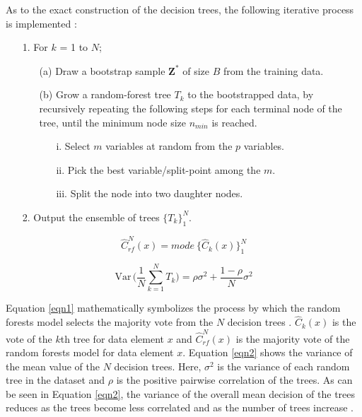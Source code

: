 \justify
As to the exact construction of the decision trees, the following iterative process is implemented \citep{Hastie2009}:
\begin{itemize}
	\item [1. ] For $k$ = 1 to $N$;
	\begin{itemize}
		\item [(a) ] Draw a bootstrap sample $\mathbf{Z^*}$ of size $B$ from the training data.
		\item [(b) ] Grow a random-forest tree $T_k$ to the bootstrapped data, by recursively repeating the following steps for each terminal node of the tree, until the minimum node size $n_{min}$ is reached.
		\begin{itemize}
			\item [i. ] Select $m$ variables at random from the $p$ variables.
			\item [ii. ] Pick the best variable/split-point among the $m$.
			\item [iii. ] Split the node into two daughter nodes.
		\end{itemize}
	\end{itemize}
	\item[2. ] Output the ensemble of trees $\{T_k\}^N_1$.
\end{itemize}

\begin{equation}
\label{eqn1}
\hat{C}^N_{rf}(x) = \textit{mode} ~\{\hat{C}_{k}(x)\}^{N}_{1}	
\end{equation}

\begin{equation}
\label{eqn2}
\mathrm{Var}\,\Bigg(\dfrac{1}{N}\sum\limits_{k=1}^N T_k\Bigg)= \rho \sigma^2 + \dfrac{1-\rho}{N}\sigma^2
\end{equation}

\justify
Equation \ref{eqn1} mathematically symbolizes the process by which the random forests model selects the majority vote from the $N$ decision trees \citep{Hastie2009}. $\hat{C}_{k}(x)$ is the vote of the $k$th tree for data element $x$ and $\hat{C}^N_{rf}(x)$ is the majority vote of the random forests model for data element $x$. Equation \ref{eqn2} shows the variance of the mean value of the $N$ decision trees. Here, $\sigma^2$ is the variance of each random tree in the dataset and $\rho$ is the positive pairwise correlation of the trees. As can be seen in Equation \ref{eqn2}, the variance of the overall mean decision of the trees reduces as the trees become less correlated and as the number of trees increase \citep{Hastie2009}. 

